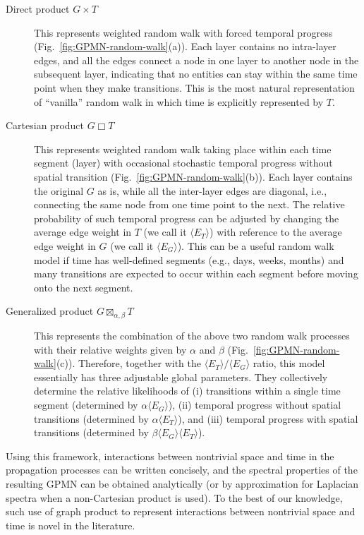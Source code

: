 \documentclass{article}
\DeclareMathOperator*{\CP}{\Box}
\DeclareMathOperator*{\DP}{\times}
\DeclareMathOperator*{\GP}{\boxtimes}
\begin{document}
\begin{description}
\item[Direct product $G \DP T$] This represents weighted random walk
  with forced temporal progress
  (Fig.~\ref{fig:GPMN-random-walk}(a)). Each layer contains no
  intra-layer edges, and all the edges connect a node in one layer to
  another node in the subsequent layer, indicating that no entities
  can stay within the same time point when they make transitions. This
  is the most natural representation of ``vanilla'' random walk in
  which time is explicitly represented by $T$.
\item[Cartesian product $G \CP T$] This represents weighted random
  walk taking place within each time segment (layer) with occasional
  stochastic temporal progress without spatial transition
  (Fig.~\ref{fig:GPMN-random-walk}(b)). Each layer contains the
  original $G$ as is, while all the inter-layer edges are diagonal,
  i.e., connecting the same node from one time point to the next. The
  relative probability of such temporal progress can be adjusted by
  changing the average edge weight in $T$ (we call it $\langle E_T
  \rangle$) with reference to the average edge weight in $G$ (we call
  it $\langle E_G \rangle$). This can be a useful random walk model if
  time has well-defined segments (e.g., days, weeks, months) and many
  transitions are expected to occur within each segment before moving
  onto the next segment.
\item[Generalized product $\displaystyle G \GP_{\alpha, \beta} T$]
  This represents the combination of the above two random walk
  processes with their relative weights given by $\alpha$ and $\beta$
  (Fig.~\ref{fig:GPMN-random-walk}(c)). Therefore, together with the
  $\langle E_T \rangle / \langle E_G \rangle$ ratio, this model
  essentially has three adjustable global parameters. They
  collectively determine the relative likelihoods of (i) transitions
  within a single time segment (determined by $\alpha \langle E_G
  \rangle$), (ii) temporal progress without spatial transitions
  (determined by $\alpha \langle E_T \rangle$), and (iii) temporal
  progress with spatial transitions (determined by $\beta \langle E_G
  \rangle \langle E_T \rangle $).
\end{description}

Using this framework, interactions between nontrivial space and time
in the propagation processes can be written concisely, and the
spectral properties of the resulting GPMN can be obtained analytically
(or by approximation for Laplacian spectra when a non-Cartesian
product is used). To the best of our knowledge, such use of graph
product to represent interactions between nontrivial space and time is
novel in the literature.
\end{document}
